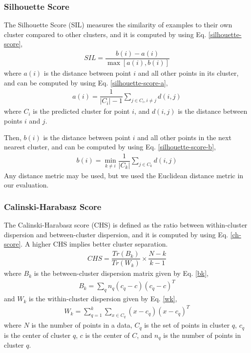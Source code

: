\documentclass[conference]{IEEEtran}
\begin{document}
\subsubsection{Silhouette Score} The Silhouette Score (SIL)\cite{rousseeuw1987silhouettes} measures the similarity of examples to their own cluster compared to other clusters, and it is computed by using Eq. \ref{silhouette-score},
\begin{align}\label{silhouette-score}
    SIL = \dfrac{b(i) - a(i)}{\max\left[a(i), b(i)\right]}
\end{align}
where $a(i)$ is the distance between point $i$ and all other points in its cluster, and can be computed by using Eq. \ref{silhouette-score-a},
\begin{align}\label{silhouette-score-a}
    a(i) = \dfrac{1}{|C_{i}| - 1} \sum_{j \in C_{i}, i \neq j} d(i, j)
\end{align}
where $C_{i}$ is the predicted cluster for point $i$, and $d(i, j)$ is the distance between points $i$ and $j$.

Then, $b(i)$ is the distance between point $i$ and all other points in the next nearest cluster, and can be computed by using Eq. \ref{silhouette-score-b},
\begin{align}\label{silhouette-score-b}
    b(i) = \min_{k \neq i} \dfrac{1}{|C_{k}|} \sum_{j \in C_{k}} d(i, j)
\end{align}
Any distance metric may be used, but we used the Euclidean distance metric in our evaluation.

\subsubsection{Calinski-Harabasz Score} The Calinski-Harabasz score\cite{calinski1974dendrite} (CHS) is defined as the ratio between within-cluster dispersion and between-cluster dispersion, and it is computed by using Eq. \ref{ch-score}. A higher CHS implies better cluster separation.
\begin{align}\label{ch-score}
    CHS = \dfrac{Tr(B_{k})}{Tr(W_{k})} \times \dfrac{N - k}{k - 1}
\end{align}
where $B_{k}$ is the between-cluster dispersion matrix given by Eq. \ref{bk},
\begin{align}\label{bk}
    B_{k} = \sum_{q} n_{q} (c_{q} - c)(c_{q} - c)^{T}
\end{align}
and $W_{k}$ is the within-cluster dispersion given by Eq. \ref{wk},
\begin{align}\label{wk}
    W_{k} = \sum_{q = 1}^{k}\sum_{x \in C_{q}} (x - c_{q})(x - c_{q})^{T}
\end{align}
where $N$ is the number of points in a data, $C_{q}$ is the set of points in cluster $q$, $c_{q}$ is the center of cluster $q$, $c$ is the center of $C$, and $n_{q}$ is the number of points in cluster $q$.
\end{document}
